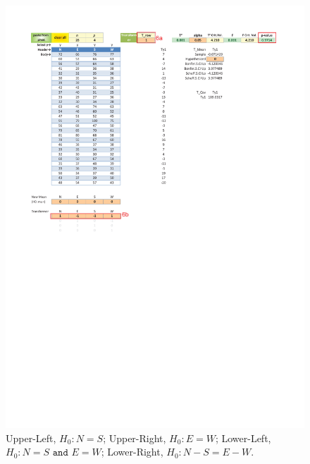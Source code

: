 \documentclass[article]{jss}
\numberwithin{equation}{subsection}
\begin{document}
\begin{figure}[!tbh]
        	\includegraphics[width=0.49\linewidth,keepaspectratio=true]{img/TsquareSheetOutput4_markup}
        	
        	\vspace{-10pt}\centering\protect\caption{Upper-Left, $H_0: N = S$; Upper-Right, $H_0: E = W$;
        		Lower-Left, $H_0: N = S \texttt{ and } E=W$;
        		Lower-Right, $H_0: N-S=E-W$.}\label{fig:Tsquare sheet: Hypotheses}
        \end{figure}
\end{document}
